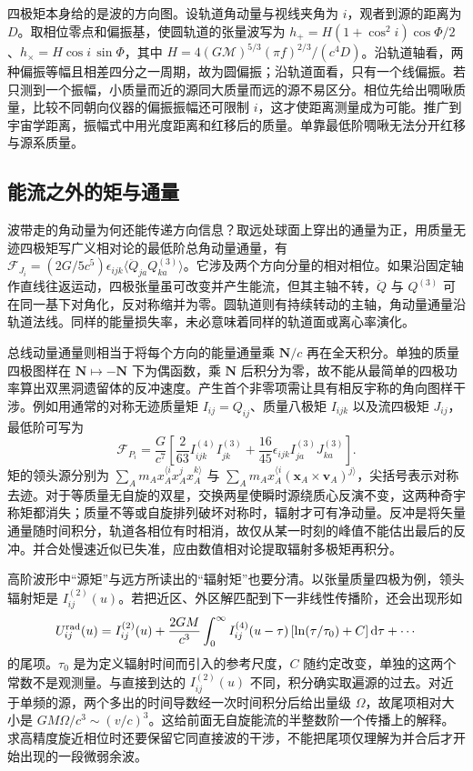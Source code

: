四极矩本身给的是波的方向图。设轨道角动量与视线夹角为 $i$，观者到源的距离为 $D$。取相位零点和偏振基，使圆轨道的张量波写为 $h_+=H(1+\cos^2i)\cos\Phi/2$、$h_\times=H\cos i\,\sin\Phi$，其中 $H=4(G\mathcal M)^{5/3}(\pi f)^{2/3}/(c^4D)$。沿轨道轴看，两种偏振等幅且相差四分之一周期，故为圆偏振；沿轨道面看，只有一个线偏振。若只测到一个振幅，小质量而近的源同大质量而远的源不易区分。相位先给出啁啾质量，比较不同朝向仪器的偏振振幅还可限制 $i$，这才使距离测量成为可能。推广到宇宙学距离，振幅式中用光度距离和红移后的质量。单靠最低阶啁啾无法分开红移与源系质量。

\subsection{能流之外的矩与通量}

波带走的角动量为何还能传递方向信息？取远处球面上穿出的通量为正，用质量无迹四极矩写广义相对论的最低阶总角动量通量，有 $\mathcal F_{J_i}=(2G/5c^5)\epsilon_{ijk}\langle\ddot Q_{ja}Q^{(3)}_{ka}\rangle$。它涉及两个方向分量的相对相位。如果沿固定轴作直线往返运动，四极张量虽可改变并产生能流，但其主轴不转，$\ddot Q$ 与 $Q^{(3)}$ 可在同一基下对角化，反对称缩并为零。圆轨道则有持续转动的主轴，角动量通量沿轨道法线。同样的能量损失率，未必意味着同样的轨道面或离心率演化。

总线动量通量则相当于将每个方向的能量通量乘 $\bm N/c$ 再在全天积分。单独的质量四极图样在 $\bm N\mapsto-\bm N$ 下为偶函数，乘 $\bm N$ 后积分为零，故不能从最简单的四极功率算出双黑洞遗留体的反冲速度。产生首个非零项需让具有相反宇称的角向图样干涉。例如用通常的对称无迹质量矩 $I_{ij}=Q_{ij}$、质量八极矩 $I_{ijk}$ 以及流四极矩 $J_{ij}$，最低阶可写为
\[
 \mathcal F_{P_i}=\frac{G}{c^7}
 \left[\frac{2}{63}I^{(4)}_{ijk}I^{(3)}_{jk}
       +\frac{16}{45}\epsilon_{ijk}I^{(3)}_{ja}J^{(3)}_{ka}\right] .
\]
矩的领头源分别为 $\sum_A m_Ax_A^{\langle i}x_A^{j}x_A^{k\rangle}$ 与 $\sum_A m_A x_A^{\langle i}(\bm x_A\times\bm v_A)^{j\rangle}$，尖括号表示对称去迹。对于等质量无自旋的双星，交换两星使瞬时源绕质心反演不变，这两种奇宇称矩都消失；质量不等或自旋排列破坏对称时，辐射才可有净动量。反冲是将矢量通量随时间积分，轨道各相位有时相消，故仅从某一时刻的峰值不能估出最后的反冲。并合处慢速近似已失准，应由数值相对论提取辐射多极矩再积分。

高阶波形中“源矩”与远方所读出的“辐射矩”也要分清。以张量质量四极为例，领头辐射矩是 $I_{ij}^{(2)}(u)$。若把近区、外区解匹配到下一非线性传播阶，还会出现形如
\[
 U_{ij}^{\rm rad}(u)=I_{ij}^{(2)}(u)
 +\frac{2GM}{c^3}\int_0^\infty I_{ij}^{(4)}(u-\tau)
        \left[\ln(\tau/\tau_0)+C\right]\dd\tau+\cdots
\]
的尾项。$\tau_0$ 是为定义辐射时间而引入的参考尺度，$C$ 随约定改变，单独的这两个常数不是观测量。与直接到达的 $I_{ij}^{(2)}(u)$ 不同，积分确实取遍源的过去。对近于单频的源，两个多出的时间导数经一次时间积分后给出量级 $\Omega$，故尾项相对大小是 $GM\Omega/c^3\sim(v/c)^3$。这给前面无自旋能流的半整数阶一个传播上的解释。求高精度旋近相位时还要保留它同直接波的干涉，不能把尾项仅理解为并合后才开始出现的一段微弱余波。

